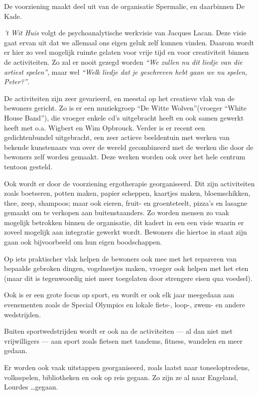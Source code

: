 \documentclass[a4paper,12pt]{article}
\begin{document}
De voorziening maakt deel uit van de organisatie Spermalie, en daarbinnen De Kade.

\emph{’t Wit Huis} volgt de psychoanalytische werkvisie van Jacques Lacan. Deze visie gaat ervan uit dat we allemaal ons eigen geluk zelf kunnen vinden. Daarom wordt er hier zo veel mogelijk ruimte gelaten voor vrije tijd en voor creativiteit binnen de activiteiten. Zo zal er nooit gezegd worden \emph{``We zullen nu dit liedje van die artiest spelen''}, maar wel \emph{``Welk liedje dat je geschreven hebt gaan we nu spelen, Peter?''}.

De activiteiten zijn zeer gevarieerd, en meestal op het creatieve vlak van de bewoners gericht. Zo is er een muziekgroep ``De Witte Wolven''(vroeger ``White House Band''), die vroeger enkele cd's uitgebracht heeft en ook samen gewerkt heeft met o.a. Wigbert en Wim Opbrouck. Verder is er recent een gedichtenbundel uitgebracht, een zeer actieve beeldentuin met werken van bekende kunstenaars van over de wereld gecombineerd met de werken die door de bewoners zelf worden gemaakt. Deze werken worden ook over het hele centrum tentoon gesteld.

Ook wordt er door de voorziening ergotherapie georganiseerd. Dit zijn activiteiten zoals boetseren, potten maken, papier scheppen, kaartjes maken, bloemschikken, thee, zeep, shampoos; maar ook eieren, fruit- en groenteteelt, pizza's en lasagne gemaakt om te verkopen aan buitenstaanders. Zo worden mensen zo vaak mogelijk betrokken binnen de organisatie, dit kadert in een een visie waarin er zoveel mogelijk aan integratie gewerkt wordt. Bewoners die hiertoe in staat zijn gaan ook bijvoorbeeld om hun eigen boodschappen.

Op iets praktischer vlak helpen de bewoners ook mee met het repareren van bepaalde gebroken dingen, vogelnestjes maken, vroeger ook helpen met het eten (maar dit is tegenwoordig niet meer toegelaten door strengere eisen qua voedsel).

Ook is er een grote focus op sport, en wordt er ook elk jaar meegedaan aan evenementen zoals de Special Olympics en lokale fiets-, loop-, zwem- en andere wedstrijden.

Buiten sportwedstrijden wordt er ook na de activiteiten --- al dan niet met vrijwilligers --- aan sport zoals fietsen met tandems, fitness, wandelen en meer gedaan.

Er worden ook vaak uitstappen georganiseerd, zoals laatst naar toneeloptredens, volksspelen, bibliotheken en ook op reis gegaan. Zo zijn ze al naar Engeland, Lourdes \dots gegaan.
\end{document}
